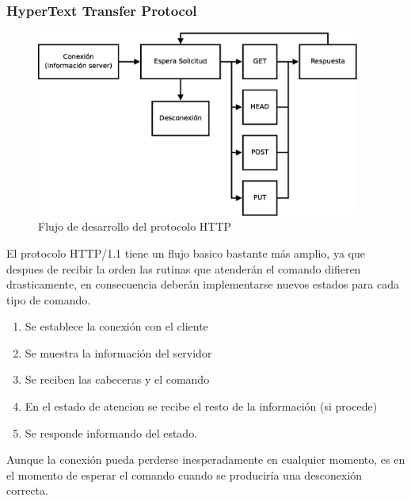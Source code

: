 \documentclass[a4paper,spanish,12pt]{book}
\begin{document}
\subsubsection{HyperText Transfer Protocol}
\begin{figure}[h]
	\includegraphics[width=0.95\textwidth]{img/DiagramaFlujoHTTP.eps}
              \caption{Flujo de desarrollo del protocolo HTTP}
  \label{fig:DiagramaFlujoHTTP}
\end{figure}
El protocolo HTTP/1.1 tiene un flujo basico bastante más amplio, ya que despues de recibir la orden las rutinas que atenderán el comando difieren drasticamente, en consecuencia deberán implementarse nuevos estados para cada tipo de comando.
\begin{enumerate}
	\item Se establece la conexión con el cliente
	\item Se muestra la información del servidor
	\item Se reciben las cabeceras y el comando
	\item En el estado de atencion se recibe el resto de la información (si procede)
	\item Se responde informando del estado.
\end{enumerate}
Aunque la conexión pueda perderse inesperadamente en cualquier momento, es en el momento de esperar el comando cuando se produciría una desconexión correcta.
\end{document}
